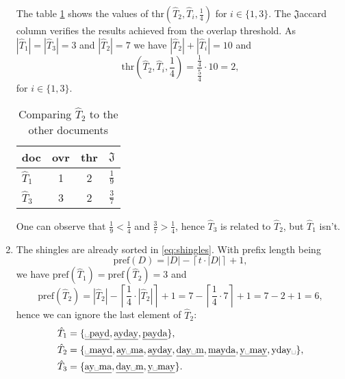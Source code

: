 \documentclass[DIN, pagenumber=false, fontsize=11pt, parskip=half]{scrartcl}
\begin{document}
\begin{enumerate}[label=(\alph*)]
The table \ref{tab:compare_d2} shows the values of $\mathrm{thr}(\hat{T}_2, \hat{T}_i, \frac{1}{4})$ for $i \in \{1, 3\}$. The $\mathfrak{J}$accard column verifies the results achieved from the overlap threshold. As $\left| \hat{T}_1 \right| = \left| \hat{T}_3 \right| = 3$ and $\left| \hat{T}_2 \right| = 7$ we have $\left| \hat{T}_2 \right| + \left| \hat{T}_i \right| = 10$ and
\[
\mathrm{thr}(\hat{T}_2, \hat{T}_i, \frac{1}{4}) = \frac{\frac{1}{4}}{\frac{5}{4}} \cdot 10 = 2,
\]
for $i \in \{1, 3\}$.

\begin{table}[!hb]
    \centering
    \begin{tabular}{|l|cc|c|}
        \hline
        doc & ovr & thr & $\mathfrak{J}$ \\ 
        \hline \hline
        $\hat{T}_1$ & 1 & 2 & $\frac{1}{9}$ \\
        $\hat{T}_3$ & 3 & 2 & $\frac{3}{7}$ \\
        \hline
    \end{tabular}
    \caption{Comparing $\hat{T}_2$ to the other documents}
    \label{tab:compare_d2}
\end{table}

One can observe that $\frac{1}{9} < \frac{1}{4}$ and $\frac{3}{7} > \frac{1}{4}$, hence $\hat{T}_3$ is related to $\hat{T}_2$, but $\hat{T}_1$ isn't.

\item

The shingles are already sorted in \eqref{eq:shingles}. With prefix length being
\[
\mathrm{pref}(D) = |D| - \left\lceil t \cdot |D| \right\rceil + 1,
\]
we have $\mathrm{pref}(\hat{T}_1) = \mathrm{pref}(\hat{T}_2) = 3$ and
\[
\mathrm{pref}(\hat{T}_2) = \left| \hat{T}_2 \right| - \left\lceil \frac{1}{4} \cdot \left| \hat{T}_2 \right| \right\rceil + 1 = 7 - \left\lceil \frac{1}{4} \cdot 7 \right\rceil + 1 = 7 - 2 + 1 = 6,
\]
hence we can ignore the last element of $\hat{T}_2$:
\begin{align*}
    & \hat{T}_1 = \{ \mbox{\underline{{}\textvisiblespace{}payd}}, \underline{\mbox{ayday}}, \underline{\mbox{payda}} \}, \\
    & \hat{T}_2 = \{ \underline{\mbox{{}\textvisiblespace{}mayd}}, \underline{\mbox{ay{}\textvisiblespace{}ma}}, \underline{\mbox{ayday}}, \underline{\mbox{day{}\textvisiblespace{}m}}, \underline{\mbox{mayda}}, \underline{\mbox{y{}\textvisiblespace{}may}}, \mbox{yday{}\textvisiblespace{}} \}, \\
    & \hat{T}_3 = \{ \underline{\mbox{ay{}\textvisiblespace{}ma}}, \underline{\mbox{day{}\textvisiblespace{}m}}, \underline{\mbox{y{}\textvisiblespace{}may}} \}.
\end{align*}

\end{enumerate}
\end{document}
